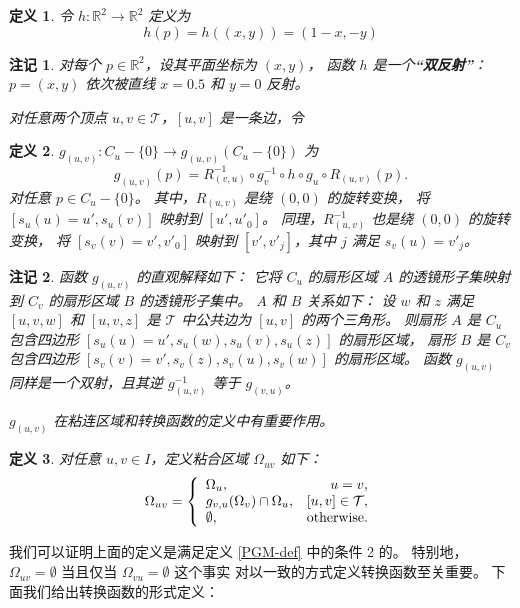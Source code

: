 \documentclass{ctexart}
\newtheorem{Def}{定义}
\newtheorem{Rmk}{注记}
\begin{document}
		\begin{Def}
			令 $h:\mathbb{R}^2\rightarrow \mathbb{R}^2$ 定义为
			\begin{equation}
				h(p) = h((x,y)) = (1-x, -y)
			\end{equation}
		\end{Def}

		\begin{Rmk}
			对每个 $p\in \mathbb{R}^2$，设其平面坐标为 $(x,y)$，
			函数 $h$ 是一个\textbf{“双反射”}：$p=(x,y)$ 依次被直线 $x=0.5$ 和 $y=0$ 反射。
	
			对任意两个顶点 $u,v\in \mathcal{T}$，$[u,v]$ 是一条边，令				
		\end{Rmk}

		\begin{Def}
			$g_{(u,v)}: C_u-\{0\}\rightarrow g_{(u,v)}(C_u-\{0\})$
			为
			\begin{equation}
				g_{(u,v)}(p) = R_{(v,u)}^{-1}\circ g_v^{-1}\circ h\circ g_u\circ R_{(u,v)}(p).
			\end{equation}
			对任意 $p\in C_u-\{0\}$。
			其中，$R_{(u,v)}$ 是绕 $(0,0)$ 的旋转变换，
			将 $[s_u(u) = u', s_u(v)]$ 映射到 $[u',u'_0]$。
			同理，$R_{(u,v)}^{-1}$ 也是绕 $(0,0)$ 的旋转变换，
			将 $[s_v(v) = v', v'_0]$ 映射到 $[v',v'_j]$，其中 $j$ 满足 $s_v(u) = v'_j$。
		\end{Def}

		\begin{Rmk}
			函数 $g_{(u,v)}$ 的直观解释如下：
			它将 $C_u$ 的扇形区域 $A$ 的透镜形子集映射到 $C_v$ 的扇形区域 $B$ 的透镜形子集中。
			$A$ 和 $B$ 关系如下：
			设 $w$ 和 $z$ 满足 $[u,v,w]$ 和 $[u,v,z]$ 是 $\mathcal{T}$ 中公共边为 $[u,v]$ 的两个三角形。
			则扇形 $A$ 是 $C_u$ 包含四边形 $[s_u(u)=u',s_u(w),s_u(v),s_u(z)]$ 的扇形区域，
			扇形 $B$ 是 $C_v$ 包含四边形 $[s_v(v)=v',s_v(z),s_v(u),s_v(w)]$ 的扇形区域。
			函数 $g_{(u,v)}$ 同样是一个双射，且其逆 $g_{(u,v)}^{-1}$ 等于 $g_{(v,u)}$。
			
			$g_{(u,v)}$ 在粘连区域和转换函数的定义中有重要作用。				
		\end{Rmk}

		\begin{Def}\label{GD-def}
			对任意 $u,v\in I$，定义粘合区域 $\Omega_{uv}$ 如下：
			\begin{equation}
				\Omega_{uv} = 
				\begin{aligned}
					\left\{
						\begin{array}{lr}
							\Omega_u, & u = v, \\
							g_{v,u}(\Omega_v)\cap \Omega_u, & [u,v]\in \mathcal{T}, \\
							\emptyset, & \rm{otherwise}.
						\end{array}
					\right.
				\end{aligned}
			\end{equation}
		\end{Def}
		我们可以证明上面的定义是满足定义 \ref{PGM-def} 中的条件 2 的。
		特别地，$\Omega_{uv} = \emptyset$ 当且仅当 $\Omega_{vu} = \emptyset$ 这个事实
		对以一致的方式定义转换函数至关重要。
		下面我们给出转换函数的形式定义：
		
\end{document}
